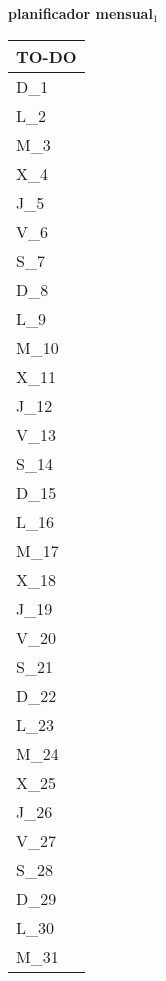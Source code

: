\clearpage
\raggedright{
	\fontsize{25}{50}\selectfont
	\textbf{\NextYear}
}\scriptsize{\textbf{planificador mensual$_1$}}\\[11.3pt]



	\noindent\dotfill
	\renewcommand{\arraystretch}{1.5}\scriptsize
		\begin{longtabu} to \textwidth { X[l]}
		\centering \small{\textbf{TO-DO}} \\
		\toprule
		D_{1} \dotfill\\
		\hline
		L_{2} \dotfill\\
		M_{3} \dotfill\\
		X_{4} \dotfill\\
		J_{5} \dotfill\\
		V_{6} \dotfill\\
		S_{7} \dotfill\\
		D_{8} \dotfill\\
		\hline
		L_{9} \dotfill\\
		M_{10} \dotfill\\
		X_{11} \dotfill\\
		J_{12} \dotfill\\
		V_{13} \dotfill\\
		S_{14} \dotfill\\
		D_{15} \dotfill\\
		\hline
		L_{16} \dotfill\\
		M_{17} \dotfill\\
		X_{18} \dotfill\\
		J_{19} \dotfill\\
		V_{20} \dotfill\\
		S_{21} \dotfill\\
		D_{22} \dotfill\\
		\hline
		L_{23} \dotfill\\
		M_{24} \dotfill\\
		X_{25} \dotfill\\
		J_{26} \dotfill\\
		V_{27} \dotfill\\
		S_{28} \dotfill\\
		D_{29} \dotfill\\
		\hline
		L_{30} \dotfill\\
		M_{31} \dotfill\\

		\bottomrule

	\end{longtabu}


\clearpage
